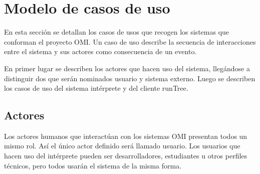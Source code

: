 

\section{Modelo de casos de uso}
En esta sección se detallan los casos de usos que recogen los sistemas que conforman el proyecto OMI. 
Un caso de uso describe la secuencia de  interacciones entre el sistema y sus
actores como consecuencia de un evento. 

En primer lugar se describen los actores que hacen uso del sistema, llegándose a distinguir dos que serán nominados 
usuario y sistema externo. Luego se describen los casos de uso del sistema intérprete y del cliente runTree. 

\subsection{Actores}
Los actores humanos que interactúan con los sistemas OMI presentan todos un mismo rol. Así el 
único actor definido será llamado usuario.  Los usuarios que hacen uso del intérprete pueden ser desarrolladores,
estudiantes u otros perfiles técnicos, pero todos usarán el sistema de la misma forma.

